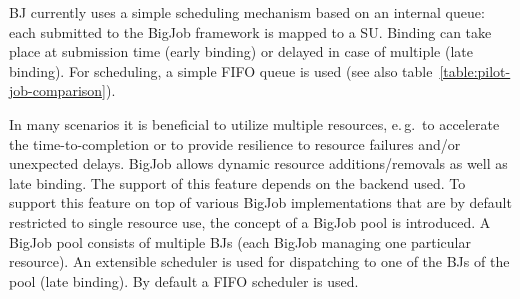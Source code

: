 \documentclass[conference]{IEEEtran}
\begin{document}
BJ currently uses a simple scheduling mechanism based on an internal queue: each
\cu submitted to the BigJob framework is mapped to a SU. Binding can take place
at submission time (early binding) or delayed in case of multiple \pilots (late
binding). For scheduling, a simple FIFO queue is used (see also
table~\ref{table:pilot-job-comparison}).



In many scenarios it is beneficial to utilize multiple resources, e.\,g.\ to
accelerate the time-to-completion or to provide resilience to resource failures
and/or unexpected delays. BigJob allows dynamic resource additions/removals as
well as late binding. The support of this feature depends on the backend used.
To support this feature on top of various BigJob implementations that are by
default restricted to single resource use, the concept of a BigJob pool is
introduced. A BigJob pool consists of multiple BJs (each BigJob managing one
particular resource). An extensible scheduler is used for dispatching \cus to
one of the BJs of the pool (late binding). By default a FIFO scheduler is used.

\end{document}
